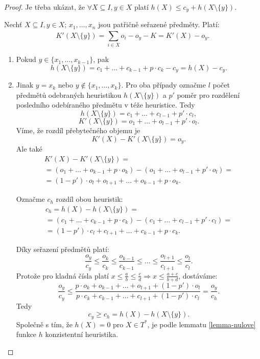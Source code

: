 \documentclass[12pt,notitlepage,fleqn]{report} %
\theoremstyle{definition}
\newcommand{\dukaz}[1]{\begin{proof} #1 \end{proof}}
\def\impl{\Rightarrow}
\newcommand{\suma}[2]{\sum\limits_{#1}^{#2}}
\begin{document}
     \dukaz{
     Je třeba ukázat, že $\forall X \subseteq I, y \in X$ platí $h(X) \leq c_y + h(X \setminus \{y\})$.
     
     Nechť $X \subseteq I, y \in X$; $x_1, \ldots, x_n$ jsou patřičně seřazené předměty. Platí:
     \[ K'(X \setminus \{y\}) = \suma{i\in X}{} o_i - o_y - K = K'(X) - o_y. \]
     \begin{enumerate}
      \item Pokud $y \in \{ x_1, \ldots, x_{k-1} \}$, pak
      \[ h(X \setminus \{y\}) = c_1 + \ldots + c_{k-1} + p \cdot c_k - c_y = h(X) - c_y. \]
      \item Jinak $y = x_k$ nebo $y \notin \{ x_1, \ldots, x_{k} \}$. Pro oba případy označme $l$ počet předmětů odebraných heuristikou $h(X \setminus \{y\})$ a $p'$ poměr pro rozdělení posledního odebíraného předmětu v téže heuristice. Tedy
      \[ h(X \setminus \{y\}) = c_1 + \ldots + c_{l-1} + p' \cdot c_l, \]
      \[ K'(X \setminus \{y\}) = o_1 + \ldots + o_{l-1} + p' \cdot o_l. \]
      Víme, že rozdíl přebytečného objemu je 
      \[K'(X) - K'(X \setminus \{y\}) = o_y.\] 
      Ale také
      \[ \begin{array}{l}
  K'(X) - K'(X \setminus \{y\}) = \\
      = (o_1 + \ldots + o_{k-1} + p \cdot o_k) - (o_1 + \ldots + o_{l-1} + p' \cdot o_l) = \\
      = (1-p') \cdot o_l + o_{l+1} + \ldots + o_{k-1} + p \cdot o_k.
      \end{array} \]

      Označme $c_h$ rozdíl obou heuristik:
      \[ \begin{array}{l}
      c_h = h(X) - h(X \setminus \{y\}) = \\
      = (c_1 + \ldots + c_{k-1} + p \cdot c_k) - (c_1 + \ldots + c_{l-1} + p' \cdot c_l) = \\ 
      = (1-p') \cdot c_l + c_{l+1} + \ldots + c_{k-1} + p \cdot c_k.
      \end{array} \]
      
      Díky seřazení předmětů platí:
      \[ \frac{o_y}{c_y} \leq \frac{o_k}{c_k} \leq \frac{o_{k-1}}{c_{k-1}} \leq \ldots \leq \frac{o_{l+1}}{c_{l+1}} \leq \frac{o_l}{c_l}. \]
      Protože pro kladná čísla platí $x \leq \frac{a}{b} \leq \frac{c}{d} \impl x \leq \frac{a+c}{b+d}$, dostáváme:
      \[ \frac{o_y}{c_y} \leq \frac{p \cdot o_k + o_{k-1} + \ldots + o_{l+1} + (1-p') \cdot o_l}{p \cdot c_k + c_{k-1} + \ldots + c_{l+1} + (1-p') \cdot c_l} = \frac{o_y}{c_h}. \]
      Tedy
      \[ c_y \geq c_h = h(X) - h(X \setminus \{y\}). \]
      Společně s tím, že $h(X)=0$ pro $X \in T^*$, je podle lemmatu \ref{lemma-nulove} funkce $h$ konzistentní heuristika.
     \end{enumerate}
     }
\end{document}
